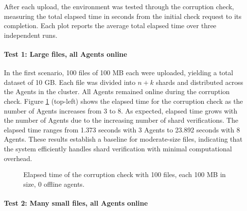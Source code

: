 After each upload, the environment was tested through the corruption check, measuring the total elapsed time in seconds from the initial check request to its completion. Each plot reports the average total elapsed time over three independent runs.

\paragraph{Test 1: Large files, all Agents online}

In the first scenario, 100 files of 100 MB each were uploaded, yielding a total
dataset of 10 GB. Each file was divided into $n+k$ shards and distributed across
the Agents in the cluster. All Agents remained online during the corruption
check. Figure \ref{fig:test-1} (top-left) shows the elapsed time for the corruption check as the number of Agents increases from 3 to 8. As expected, elapsed time grows with the number of Agents due to the increasing number of shard verifications. The elapsed time ranges from 1.373 seconds with 3 Agents to 23.892 seconds with 8 Agents. These results establish a baseline for moderate-size files, indicating that the system efficiently handles shard verification with minimal computational overhead.

\begin{figure}[!ht]
\centering
{}
\caption{Elapsed time of the corruption check with 100 files, each 100 MB in size, 0 offline agents.}
\label{fig:test-1}
\end{figure}


\newpage
\paragraph{Test 2: Many small files, all Agents online}


